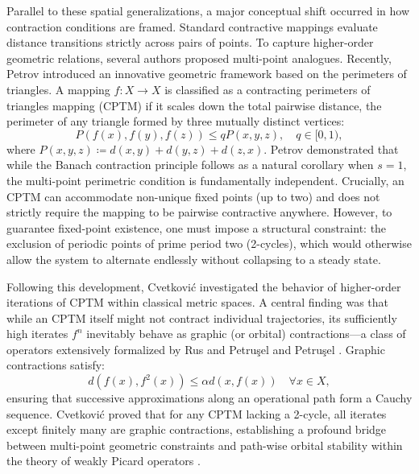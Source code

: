 \documentclass[a4paper,12pt,oneside]{article}
\numberwithin{equation}{section}
\begin{document}
Parallel to these spatial generalizations, a major conceptual shift occurred in how contraction conditions are framed. Standard contractive mappings evaluate distance transitions strictly across pairs of points. To capture higher-order geometric relations, several authors proposed multi-point analogues. Recently, Petrov \cite{petrov2023a} introduced an innovative geometric framework based on the perimeters of triangles. A mapping $f:X\to X$ is classified as a contracting perimeters of triangles mapping (CPTM) if it scales down the total pairwise distance, the perimeter of any triangle formed by three mutually distinct vertices:
\begin{equation}
P(f(x),f(y),f(z))\leq qP(x,y,z),\quad q\in [0,1),
\label{eq:mcpT_intro}
\end{equation}
where $P(x,y,z)\coloneqq d(x,y) + d(y,z) + d(z,x)$. Petrov demonstrated that while the Banach contraction principle follows as a natural corollary when $s = 1$, the multi-point perimetric condition is fundamentally independent. Crucially, an CPTM can accommodate non-unique fixed points (up to two) and does not strictly require the mapping to be pairwise contractive anywhere. However, to guarantee fixed-point existence, one must impose a structural constraint: the exclusion of periodic points of prime period two (2-cycles), which would otherwise allow the system to alternate endlessly without collapsing to a steady state.

Following this development, Cvetković \cite{cvetkovic2026} investigated the behavior of higher-order iterations of CPTM within classical metric spaces. A central finding was that while an CPTM itself might not contract individual trajectories, its sufficiently high iterates $f^{n}$ inevitably behave as graphic (or orbital) contractions—a class of operators extensively formalized by Rus \cite{rus1993,rus2001,rus2003,rus2008} and Petruşel and Petruşel \cite{petrusel2023}. Graphic contractions satisfy:
\begin{equation}
d(f(x),f^{2}(x))\leq \alpha d(x,f(x))\quad \forall x\in X,
\label{eq:graphic_intro}
\end{equation}
ensuring that successive approximations along an operational path form a Cauchy sequence. Cvetković proved that for any CPTM lacking a 2-cycle, all iterates except finitely many are graphic contractions, establishing a profound bridge between multi-point geometric constraints and path-wise orbital stability within the theory of weakly Picard operators \cite{rus2003,petrusel2019}.
\end{document}

